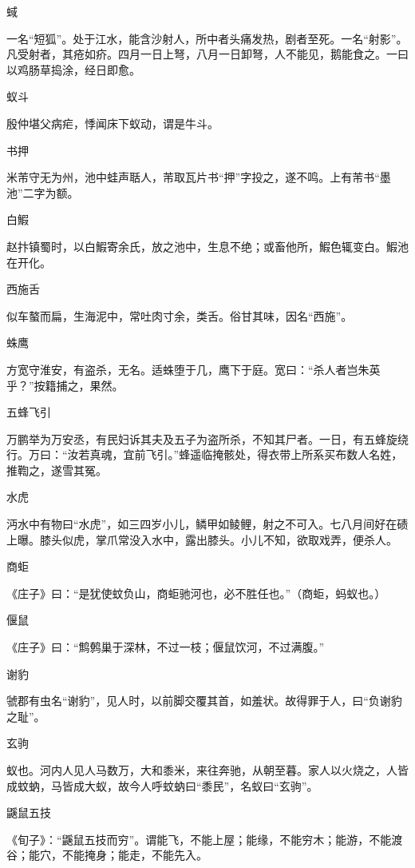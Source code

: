 \documentclass[a4paper,12pt,UTF8,twoside]{ctexbook}
\begin{document}
    蜮
    
    一名“短狐”。处于江水，能含沙射人，所中者头痛发热，剧者至死。一名“射影”。凡受射者，其疮如疥。四月一日上弩，八月一日卸弩，人不能见，鹅能食之。一曰以鸡肠草捣涂，经日即愈。
    
    蚁斗
    
    殷仲堪父病疟，悸闻床下蚁动，谓是牛斗。
    
    书押
    
    米芾守无为州，池中蛙声聒人，芾取瓦片书“押”字投之，遂不鸣。上有芾书“墨池”二字为额。
    
    白鰕
    
    赵抃镇蜀时，以白鰕寄余氏，放之池中，生息不绝；或畜他所，鰕色辄变白。鰕池在开化。
    
    西施舌
    
    似车螯而扁，生海泥中，常吐肉寸余，类舌。俗甘其味，因名“西施”。
    
    蛛鹰
    
    方宽守淮安，有盗杀，无名。适蛛堕于几，鹰下于庭。宽曰：“杀人者岂朱英乎？”按籍捕之，果然。
    
    五蜂飞引
    
    万鹏举为万安丞，有民妇诉其夫及五子为盗所杀，不知其尸者。一日，有五蜂旋绕行。万曰：“汝若真魂，宜前飞引。”蜂遥临掩骸处，得衣带上所系买布数人名姓，推鞫之，遂雪其冤。
    
    水虎
    
    沔水中有物曰“水虎”，如三四岁小儿，鳞甲如鲮鲤，射之不可入。七八月间好在碛上曝。膝头似虎，掌爪常没入水中，露出膝头。小儿不知，欲取戏弄，便杀人。
    
    商蚷
    
    《庄子》曰：“是犹使蚊负山，商蚷驰河也，必不胜任也。”（商蚷，蚂蚁也。）
    
    偃鼠
    
    《庄子》曰：“鹪鹩巢于深林，不过一枝；偃鼠饮河，不过满腹。”
    
    谢豹
    
    虢郡有虫名“谢豹”，见人时，以前脚交覆其首，如羞状。故得罪于人，曰“负谢豹之耻”。
    
    玄驹
    
    蚁也。河内人见人马数万，大和黍米，来往奔驰，从朝至暮。家人以火烧之，人皆成蚊蚋，马皆成大蚁，故今人呼蚊蚋曰“黍民”，名蚁曰“玄驹”。
    
    鼷鼠五技
    
    《旬子》：“鼷鼠五技而穷”。谓能飞，不能上屋；能缘，不能穷木；能游，不能渡谷；能穴，不能掩身；能走，不能先入。
    
\end{document}
